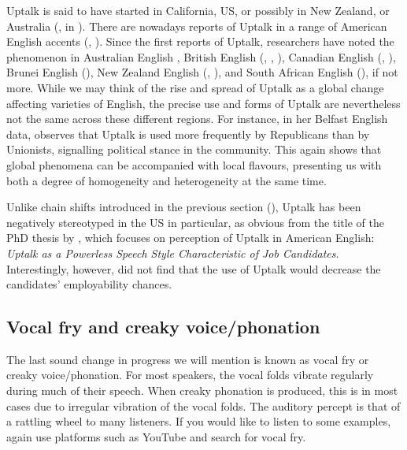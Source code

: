 Uptalk is said to have started in California, US, or possibly in New Zealand, or Australia (\citealp[37]{Wells2006}, in \citealp{MohamadDeterding2016}). There are nowadays reports of Uptalk in a range of American English accents (\citealp{McLemore1991}, \citealp{RitchartArvaniti2014}). Since the first reports of Uptalk, researchers have noted the phenomenon in Australian English \citep{FletcherGrabeWarren2005}, British English (\citealp[36]{Bradford1997}, \citealp{Jespersen2018}, \citealp{ShobbrookHouse2003}), Canadian English (\citealp{Sando2009}, \citealp{Shokeir2008}), Brunei English (\citealp{MohamadDeterding2016}), New Zealand English (\citealp{Britain1992}, \citealp{FletcherGrabeWarren2005}), and South African English (\citealp[146]{Bekker2012}), if not more. While we may think of the rise and spread of Uptalk as a global change affecting varieties of English, the precise use and forms of Uptalk are nevertheless not the same across these different regions. For instance, in her Belfast English data, \citet[529]{Jespersen2018} observes that Uptalk is used more frequently by Republicans than by Unionists, signalling political stance in the community. This again shows that global phenomena can be accompanied with local flavours, presenting us with both a degree of homogeneity and heterogeneity at the same time.

Unlike chain shifts introduced in the previous section (), Uptalk has been negatively stereotyped in the US in particular, as obvious from the title of the PhD thesis by \citet{Gorelik2016}, which focuses on perception of Uptalk in American English: \textit{Uptalk as a Powerless Speech Style Characteristic of Job Candidates}. Interestingly, however, \citet{Gorelik2016} did not find that the use of Uptalk would decrease the candidates' employability chances.

\subsection{Vocal fry and creaky voice/phonation}
The last sound change in progress we will mention is known as vocal fry or creaky voice/phonation. For most speakers, the vocal folds vibrate regularly during much of their speech. When creaky phonation is produced, this is in most cases due to irregular vibration of the vocal folds. The auditory percept is that of a rattling wheel to many listeners. If you would like to listen to some examples, again use platforms such as YouTube and search for vocal fry.

